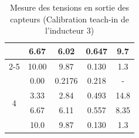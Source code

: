 \begin{table}[H]
\begin{tabular}{|c|c|c|c|c|}
                           & 6.67              & 6.02            & 0.647  & 9.7                      \\ \cline{2-5}
                           & 10.00             & 9.87            & 0.130  & 1.3                      \\ \hline
        \multirow{4}{*}{4} & 0.00              & 0.2176          & 0.218  & -                        \\ \cline{2-5}
                           & 3.33              & 2.84            & 0.493  & 14.8                     \\ \cline{2-5}
                           & 6.67              & 6.11            & 0.557  & 8.35                     \\ \cline{2-5}
                           & 10.0              & 9.87            & 0.130  & 1.3                      \\ \hline
    \end{tabular}
    \caption{Mesure des tensions en sortie des capteurs (Calibration teach-in de l'inducteur 3)}
    \label{tab:teachin_3_capteurs}
\end{table}

